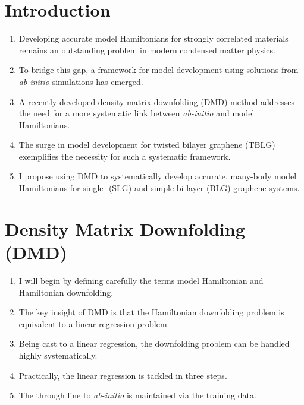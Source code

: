 \documentclass{article}
\begin{document}
\section{Introduction}
\begin{enumerate}
\item Developing accurate model Hamiltonians for strongly correlated materials remains an outstanding problem in modern condensed matter physics.

\item To bridge this gap, a framework for model development using solutions from \textit{ab-initio} simulations has emerged.

\item A recently developed density matrix downfolding (DMD) method addresses the need for a more systematic link between \textit{ab-initio} and model Hamiltonians.

\item The surge in model development for twisted bilayer graphene (TBLG) exemplifies the necessity for such a systematic framework.

\item I propose using DMD to systematically develop accurate, many-body model Hamiltonians for single- (SLG) and simple bi-layer (BLG) graphene systems.
\end{enumerate}

\section{Density Matrix Downfolding (DMD)}
\begin{enumerate}
\item I will begin by defining carefully the terms model Hamiltonian and Hamiltonian downfolding.

\item The key insight of DMD is that the Hamiltonian downfolding problem is equivalent to a linear regression problem.

\item Being cast to a linear regression, the downfolding problem can be handled highly systematically.

\item Practically, the linear regression is tackled in three steps.

\item The through line to \textit{ab-initio} is maintained via the training data.
\end{enumerate}
\end{document}
